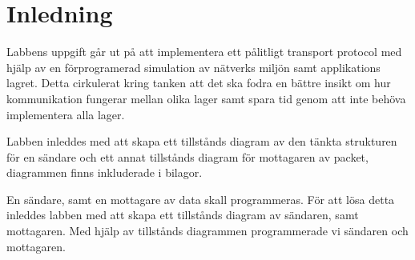 \section{Inledning}

Labbens uppgift går ut på att implementera ett pålitligt transport protocol med hjälp av en
förprogramerad simulation av nätverks miljön samt applikations lagret. Detta cirkulerat kring
tanken att det ska fodra en bättre insikt om hur kommunikation fungerar mellan olika lager samt
spara tid genom att inte behöva implementera alla lager. 

Labben inleddes med att skapa ett tillstånds diagram av den tänkta strukturen för en sändare och
ett annat tillstånds diagram för mottagaren av packet, diagrammen finns inkluderade i bilagor.

En sändare, samt en mottagare av data skall programmeras. För att lösa detta inleddes
labben med att skapa ett tillstånds diagram av sändaren, samt mottagaren.
 Med hjälp av tillstånds diagrammen programmerade vi sändaren och mottagaren.

